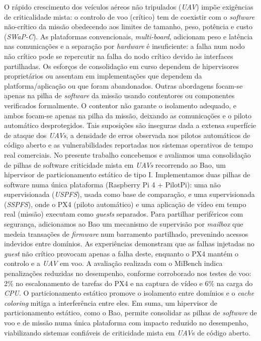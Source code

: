 
%

O rápido crescimento dos veículos aéreos não tripulados (\emph{UAV})
impõe exigências de criticalidade mista: o controlo de voo (crítico) tem de
coexistir com o \emph{software} não-crítico da missão obedecendo aos limites de
tamanho, peso, potência e custo (\emph{SWaP-C}). As plataformas convencionais, \emph{multi-board},
adicionam peso e latência nas comunicações e a separação por \emph{hardware} é
insuficiente: a falha num nodo não crítico pode se repercutir na falha do nodo
crítico devido às interfaces partilhadas. Os esforços de consolidação em curso
dependem de hipervisores proprietários ou assentam em implementações que
dependem da platforma/aplicação ou que foram abandonados.
%
Outras abordagens focam-se apenas na pilha de \emph{software} da missão usando
contentores ou componentes verificados formalmente. O contentor não garante
o isolamento adequado, e ambos focam-se apenas na pilha da missão,
deixando as comunicações e o piloto automático desprotegidos.
Tais suposições são inseguras dada a extensa superfície de ataque dos \emph{UAVs}, a
densidade de erros observada nos pilotos automáticos de código aberto e as
vulnerabilidades reportadas nos sistemas operativos de tempo real comerciais.
%
No presente trabalho concebemos e avaliamos uma consolidação de pilhas de software criticidade mista em \emph{UAVs} recorrendo ao Bao, um
hipervisor de particionamento estático de tipo I. Implementamos duas pilhas de
software numa única plataforma (Raspberry Pi 4 + PilotPi): uma não
supervisionada (\emph{USPFS}), usada como base de comparação, e uma supervisionada
(\emph{SSPFS}), onde o PX4 (piloto automático) e uma aplicação de vídeo em tempo
real (missão) executam como \emph{guests} separados. Para partilhar periféricos
com segurança, adicionamos ao Bao um mecanismo de supervisão por \emph{mailbox}
que medeia transações de \emph{firmware} num barramento partilhado, prevenindo
acessos indevidos entre domínios.
%
As experiências demonstram que as falhas injetadas
no \emph{guest} não crítico provocam apenas a falha deste, enquanto o
PX4 mantém o controlo e a \emph{UAV} em voo. A avaliação realizada com o MiBench
indica penalizações reduzidas no desempenho, conforme corroborado nos testes
de voo: 2\% no escalonamento de tarefas do PX4 e na captura de
vídeo e 6\% na carga do \emph{CPU}. O particionamento estático promove o
isolamento entre domínios e o \emph{cache coloring} mitiga a interferência entre eles.
%
Em suma, um hipervisor de particionamento estático, como o Bao, permite consolidar as
pilhas de \emph{software} de voo e de missão numa única plataforma com impacto
reduzido no desempenho, viabilizando
sistemas confiáveis de criticidade mista em \emph{UAV}s de código aberto.

